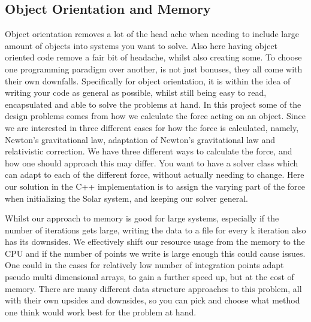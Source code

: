 \documentclass[%
reprint,
nofootinbib,
amsmath,amssymb,
aps,
]{revtex4-1}
\begin{document}
\subsection{Object Orientation and Memory} %
Object orientation removes a lot of the head ache when needing to include large amount of objects into systems you want to solve. Also here having object oriented code remove a fair bit of headache, whilst also creating some. To choose one programming paradigm over another, is not just bonuses, they all come with their own downfalls. Specifically for object orientation, it is within the idea of writing your code as general as possible, whilst still being easy to read, encapsulated and able to solve the problems at hand. In this project some of the design problems comes from how we calculate the force acting on an object. Since we are interested in three different cases for how the force is calculated, namely, Newton's gravitational law, adaptation of Newton's gravitational law and relativistic correction. We have three different ways to calculate the force, and how one should approach this may differ. 
You want to have a solver class which can adapt to each of the different force, without actually needing to change. Here our solution in the C++ implementation is to assign the varying part of the force when initializing the Solar system, and keeping our solver general. 

Whilst our approach to memory is good for large systems, especially if the number of iterations gets large, writing the data to a file for every k iteration also has its downsides. We effectively shift our resource usage from the memory to the CPU and if the number of points we write is large enough this could cause issues. 
One could in the cases for relatively low number of integration points adapt pseudo multi dimensional arrays, to gain a further speed up, but at the cost of memory. There are many different data structure approaches to this problem, all with their own upsides and downsides, so you can pick and choose what method one think would work best for the problem at hand. 
\end{document}
